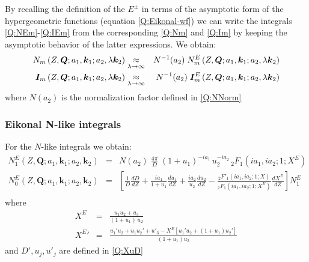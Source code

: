By recalling the definition of the $E^{\pm}$ in terms of the asymptotic
form of the hypergeometric functions (equation \ref{Q:Eikonal-wf}) we
can write the integrals \ref{Q:NEm}-\ref{Q:IEm} from the corresponding
\ref{Q:Nm} and \ref{Q:Im} by keeping the asymptotic behavior of the
latter expressions. We obtain:
%
\begin{eqnarray*}
N_{m} \left(Z, \bm{Q} ; a_{1}, \bm{k}_{1} ; a_{2}, \lambda \bm{k}_{2}
\right) &\mathrel{\mathop{\kern0pt\approx}\limits_{\lambda \to \infty}}& N^{-1}(a_{2}) \; N^{E}_{m}
\left(Z, \bm{Q}; a_{1}, \bm{k}_{1} ; a_{2}, \lambda \bm{k}_{2} \right)
\\
\bm{I}_{m} \left(Z, \bm{Q} ; a_{1}, \bm{k}_{1} ; a_{2}, \lambda
\bm{k}_{2} \right) &\mathrel{\mathop{\kern0pt\approx}\limits_{\lambda \to \infty}}& N^{-1}(a_{2})
\; \bm{I}^{E}_{m} \left(Z, \bm{Q} ; a_{1}, \bm{k}_{1} ; a_{2}, \lambda
\bm{k}_{2} \right)
\end{eqnarray*}
where $N(a_{2})$ is the normalization factor defined in \ref{Q:NNorm}

\subsubsection{Eikonal N-like integrals}

For the $N$-like integrals we obtain:
%
\begin{eqnarray}\label{Q:N-integ}
N^{E}_{1} \left(Z, \bm{Q} ; a_{1}, \bm{k}_{1} ; a_{2}, \bm{k}_{2}
\right) &=& N(a_{2})\;\frac{4 \pi}{D} \; \left( 1 + u_{1}
\right)^{-i a_{1}} \, u_{2}^{-i a_{2}} \, {_{2}F_{1}}\left( i
a_{1} , i a_{2} ; 1 ; X^{E} \right)
\\
N^{E}_{0} \left(Z, \bm{Q} ; a_{1}, \bm{k}_{1} ; a_{2}, \bm{k}_{2}
\right) &=& \left[ \frac{1}{D} \frac{d D}{d Z} + \frac{i
a_{1}}{1 + u_{1}} \frac{d u_{1}}{d Z} + \frac{i a_{2}}{u_{2}}
\frac{d u_{2}}{d Z} - \frac{{_{2}F'_{1}}(i a_{1}, i a_{2};
1; X)}{{_{2}F_{1}}(i a_{1}, i a_{2}; 1; X^{E})} \frac{d
X^{E}}{d Z} \right] N^{E}_{1} \nonumber
\\
\end{eqnarray}
%
where
\begin{eqnarray*}
X^{E} &=& \frac{u_{1} u_{2} + u_{3}}{(1+u_{1}) \, u_{2}}  \nonumber \\
{X^{E}}' &=& \frac{ u_{1}' u_{2} + u_{1} u_{2}' + u'_{3} - X^{E} \left[
u_{1}' u_{2} + (1+u_{1}) u_{2}' \right]}{(1 + u_{1})u_{2}}
\end{eqnarray*}
%
and $D',u_{j},u'_{j}$ are defined in \ref{Q:XuD}


